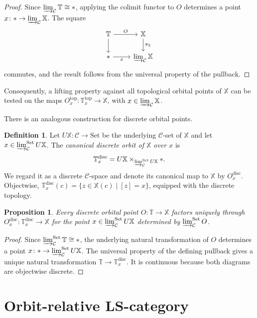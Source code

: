 \documentclass[12pt]{amsart}
\newtheorem{prop}[teo]{Proposition}
\theoremstyle{definition}
\newtheorem{defi}[teo]{Definition}
\theoremstyle{remark}
\numberwithin{figure}{section}%
\newcommand{\CC}{\mathcal{C}}
\newcommand{\X}{\mathbb{X}}
\newcommand{\T}{\mathbb{T}}
\newcommand{\Set}{\mathrm{Set}}
\begin{document}
\begin{proof}
Since $\varinjlim_{\CC}\T\cong *$, applying the colimit functor to $O$
determines a point $x\colon *\to\varinjlim_{\CC}\X$. The square
\[
\begin{tikzcd}
\T
  \arrow[r,"O"]
  \arrow[d]
&
\X
  \arrow[d,"\pi_{\X}"]
\\
*
  \arrow[r,"x"']
&
\varinjlim_{\CC}\X
\end{tikzcd}
\]
commutes, and the result follows from the universal property of the
pullback.
\end{proof}

Consequently, a lifting property against all topological orbital points
of $\X$ can be tested on the maps
$O_x^{\mathrm{top}}\colon\T_x^{\mathrm{top}}\to\X$, with
$x\in\varinjlim_{\CC}\X$.

There is an analogous construction for discrete orbital points.

\begin{defi}\label{def:canonical-discrete-orbit}
Let $U\X\colon\CC\to\Set$ be the underlying $\CC$-set of $\X$ and let
$x\in\varinjlim_{\CC}^{\Set}U\X$. The \emph{canonical discrete orbit of
$\X$ over $x$} is
\[
\T_x^{\mathrm{disc}}
=
U\X\times_{\varinjlim_{\CC}^{\Set}U\X}*.
\]
We regard it as a discrete $\CC$-space and denote its canonical map to
$\X$ by $O_x^{\mathrm{disc}}$. Objectwise,
$\T_x^{\mathrm{disc}}(c)=\{z\in\X(c)\mid[z]=x\}$, equipped with the
discrete topology.
\end{defi}

\begin{prop}\label{prop:discrete-orbits-point}
Every discrete orbital point $O\colon\T\to\X$ factors uniquely through
$O_x^{\mathrm{disc}}\colon\T_x^{\mathrm{disc}}\to\X$ for the point
$x\in\varinjlim_{\CC}^{\Set}U\X$ determined by
$\varinjlim_{\CC}^{\Set}O$.
\end{prop}

\begin{proof}
Since $\varinjlim_{\CC}^{\Set}\T\cong *$, the underlying natural
transformation of $O$ determines a point
$x\colon *\to\varinjlim_{\CC}^{\Set}U\X$. The universal property of the
defining pullback gives a unique natural transformation
$\T\to\T_x^{\mathrm{disc}}$. It is continuous because both diagrams are
objectwise discrete.
\end{proof}


\section{Orbit-relative LS-category}
\label{sec:orbit-relative-category}
\end{document}

